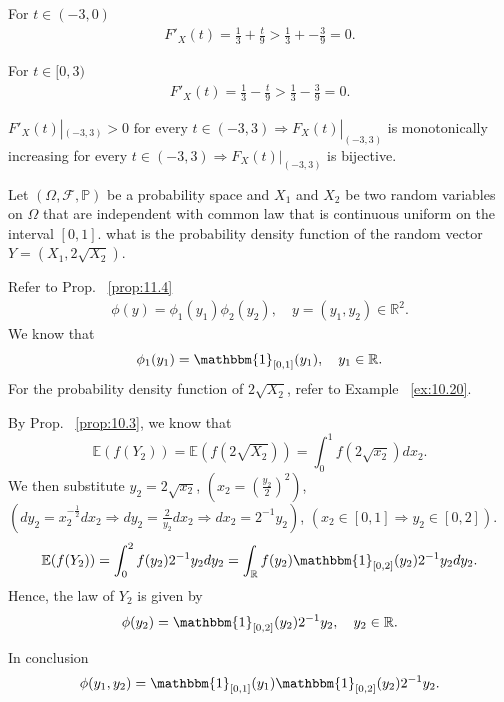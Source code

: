 \begin{exercise}[]
\begin{enumerate}[label=(\alph*), start=2]
            For $t \in (-3, 0) $
            \begin{align*}
                F'_X(t) = \frac{1}{3} + \frac{t}{9} > \frac{1}{3} + -\frac{3}{9} = 0
            .\end{align*}

            For $t \in [0, 3) $
            \begin{align*}
                F'_X(t) = \frac{1}{3} - \frac{t}{9} > \frac{1}{3} - \frac{3}{9} = 0
            .\end{align*}

            $F'_X(t)|_{(-3,3)} > 0 \text{ for every } t \in (-3, 3) \Rightarrow F_X(t)|_{(-3,3)}$
            is monotonically increasing for every $t \in (-3, 3) \Rightarrow F_X(t)|_{(-3,3)}$
            is bijective.

    \end{enumerate}
\end{exercise}

\begin{exercise}[]
    \label{ex:12.4}
    Let $(\Omega, \mathcal{F}, \mathbb{P})$ be a probability space and $X_1 $ and $X_2 $ be two
    random variables on $\Omega$ that are independent with common law that is continuous uniform
    on the interval $\left[ 0,1 \right]  $. what is the probability density function of the
    random vector $Y=(X_1, 2\sqrt{X_2} ) $.

    Refer to Prop. ~\ref{prop:11.4}
    \begin{align*}
      \phi(y) = \phi_1(y_1)\phi_2(y_2), \quad y = (y_1, y_2) \in \mathbb{R}^{2}
    .\end{align*}
    We know that 
    \begin{align*}
      \phi_1(y_1)= \mathbbm{1}_{[0,1]}(y_1), \quad y_1 \in \mathbb{R} 
    .\end{align*}
    For the probability density function of $2\sqrt{X_2}  $, refer to Example ~\ref{ex:10.20}.
    
    By Prop. ~\ref{prop:10.3}, we know that 
    \[
      \mathbb{E}(f(Y_2)) = \mathbb{E}(f(2\sqrt{X_2} )) = \int_{0}^{1} f(2\sqrt{x_2})dx_2.
    \] 
    We then substitute $y_2 = 2\sqrt{x_2} $,  $\left( x_2 = \left( \frac{y_2}{2} \right)^2  \right)$,
    $\left( dy_2 = x_2^{-\frac{1}{2}} dx_2 \Rightarrow dy_2 = \frac{2}{y_2}dx_2 \Rightarrow dx_2 = 2^{-1}y_2\right)  $,
    $\left( x_2 \in \left[ 0,1 \right] \Rightarrow y_2 \in \left[ 0,2 \right]  \right)  $.
    \[
    \mathbb{E}(f(Y_2)) = \int_{0}^{2} f(y_2)2^{-1}y_2dy_2 = \int_{\mathbb{R}} f(y_2)\mathbbm{1}_{[0,2]}(y_2)2^{-1}y_2dy_2
    .\] 
    Hence, the law of $Y_2 $ is given by
    \[
    \phi(y_2) = \mathbbm{1}_{[0,2]}(y_2)2^{-1}y_2, \quad y_2 \in \mathbb{R}
    .\] 

    In conclusion
    \[
      \phi(y_1, y_2) = \mathbbm{1}_{\left[ 0,1 \right] }(y_1) \mathbbm{1}_{\left[ 0,2 \right] }(y_2) 2^{-1}y_2 
    .\] 
\end{exercise}

